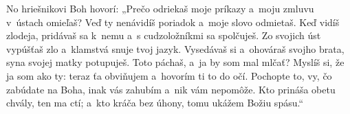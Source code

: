 No hriešnikovi Boh hovorí:
„Prečo odriekaš moje príkazy
a~moju zmluvu v~ústach omieľaš?
\versseparator
Veď ty nenávidíš poriadok
a~moje slovo odmietaš.
\versseparator
Keď vidíš zlodeja, pridávaš sa k~nemu
a~s cudzoložníkmi sa spolčuješ.
\versseparator
Zo svojich úst vypúšťaš zlo
a~klamstvá snuje tvoj jazyk.
\versseparator
Vysedávaš si a~ohováraš svojho brata,
syna svojej matky potupuješ.
Toto páchaš, a~ja by som mal mlčať?
\versseparator
Myslíš si, že ja som ako ty:
teraz ťa obviňujem a~hovorím ti to do očí.
\versseparator
Pochopte to, vy, čo zabúdate na Boha,
inak vás zahubím a~nik vám nepomôže.
\versseparator
Kto prináša obetu chvály, ten ma ctí;
a~kto kráča bez úhony, tomu ukážem Božiu spásu.“